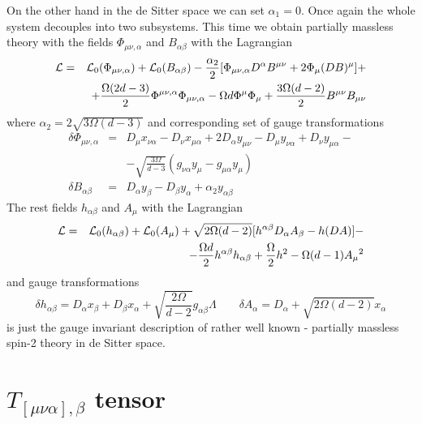 \documentclass[a4paper,12pt]{article}
\begin{document}
On the other hand in the de Sitter space we can set $\alpha_1 = 0$.
Once again the whole system decouples into two subsystems. This time
we obtain partially massless theory with the fields $\Phi_{\mu\nu,\alpha}$
and $B_{\alpha\beta}$ with the Lagrangian
\begin{eqnarray}
{\cal L} &=& {\cal L}_0 (\Phi_{\mu\nu,\alpha}) + {\cal L}_0 (B_{\alpha\beta})
- \frac{\alpha_2}{2} [ \Phi_{\mu\nu,\alpha} D^\alpha B^{\mu\nu} + 2
\Phi_\mu (D B)^\mu ] + \nonumber \\
 && + \frac{\Omega(2d-3)}{2} \Phi^{\mu\nu,\alpha} \Phi_{\mu\nu,\alpha}
 - \Omega d \Phi^\mu \Phi_\mu + \frac{3\Omega(d-2)}{2} B^{\mu\nu} B_{\mu\nu}
\end{eqnarray}
where $\alpha_2 = 2 \sqrt{3\Omega(d-3)}$ and corresponding set of
gauge transformations
\begin{eqnarray}
\delta \Phi_{\mu\nu,\alpha} &=& D_\mu x_{\nu\alpha} - D_\nu x_{\mu\alpha}
+ 2 D_\alpha y_{\mu\nu} - D_\mu y_{\nu\alpha} + D_\nu y_{\mu\alpha} -
\nonumber \\
 && - \sqrt{\frac{3\Omega}{d-3}} (g_{\nu\alpha} y_\mu - g_{\mu\alpha}
 y_\mu) \\
\delta B_{\alpha\beta} &=& D_\alpha y_\beta - D_\beta y_\alpha +
\alpha_2 y_{\alpha\beta} \nonumber
\end{eqnarray}
The rest fields $h_{\alpha\beta}$ and $A_\mu$ with the Lagrangian
\begin{eqnarray}
{\cal L} &=& {\cal L}_0 (h_{\alpha\beta}) + {\cal L}_0 (A_\mu) +
\sqrt{2\Omega(d-2)} [ h^{\alpha\beta} D_\alpha A_\beta - h (D A) ] -
\nonumber \\
 && - \frac{\Omega d}{2} h^{\alpha\beta} h_{\alpha\beta} + \frac{\Omega}{2}
 h^2 - \Omega (d-1) A_\mu{}^2
\end{eqnarray}
and gauge transformations
\begin{equation}
\delta h_{\alpha\beta} = D_\alpha x_\beta + D_\beta x_\alpha +
\sqrt{\frac{2\Omega}{d-2}} g_{\alpha\beta} \Lambda \qquad \delta A_\alpha =
D_\alpha + \sqrt{2\Omega(d-2)} x_\alpha
\end{equation}
is just the gauge invariant description \cite{Zin01} of rather well
known \cite{DN83}-\cite{DW01c} partially massless spin-2 theory in de 
Sitter space.

\section{$T_{[\mu\nu\alpha],\beta}$ tensor}
\end{document}
